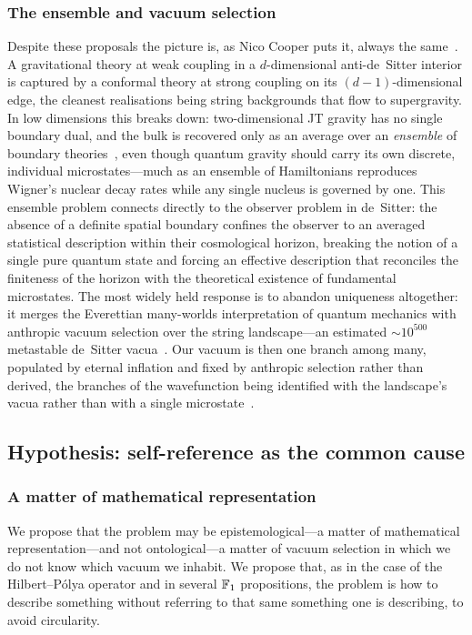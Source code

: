 \subsubsection{The ensemble and vacuum selection}\label{sssec:ensemble}
Despite these proposals the picture is, as Nico Cooper puts it, always the same~\cite{Cooper2026}. A gravitational theory at weak coupling in a
$d$-dimensional anti-de~Sitter interior is captured by a conformal theory at strong coupling on its
$(d{-}1)$-dimensional edge, the cleanest realisations being string backgrounds that flow to supergravity. In low
dimensions this breaks down: two-dimensional JT gravity has no single boundary dual, and the bulk is recovered
only as an average over an \emph{ensemble} of boundary theories~\cite{SSS19,Cooper2026}, even though quantum
gravity should carry its own discrete, individual microstates---much as an ensemble of Hamiltonians reproduces
Wigner's nuclear decay rates while any single nucleus is governed by one. This ensemble
problem connects directly to the observer problem in de~Sitter: the absence of a definite spatial boundary confines
the observer to an averaged statistical description within their cosmological horizon, breaking the notion of a
single pure quantum state and forcing an effective description that reconciles the finiteness of the horizon with
the theoretical existence of fundamental microstates. The most widely held response is to abandon uniqueness altogether: it merges the Everettian
many-worlds interpretation of quantum mechanics with anthropic vacuum selection over the string
landscape---an estimated $\sim\!10^{500}$ metastable de~Sitter
vacua~\cite{BoussoPolchinski00,Douglas03,Susskind03}. Our vacuum is then one branch among many,
populated by eternal inflation and fixed by anthropic selection rather than derived, the branches
of the wavefunction being identified with the landscape's vacua rather than with a single
microstate~\cite{BoussoSusskind11}.

\subsection{Hypothesis: self-reference as the common cause}\label{sec:hypothesis}

\subsubsection{A matter of mathematical representation}\label{sssec:mathrep}
We propose that the problem may be epistemological---a matter of mathematical representation---and not ontological---a matter of vacuum selection in which we do not know which vacuum we inhabit. We propose that, as in the case of the Hilbert--P\'olya operator and in several $\mathbb{F}_1$ propositions, the problem is how to describe something without referring to that same something one is describing, to avoid circularity.

